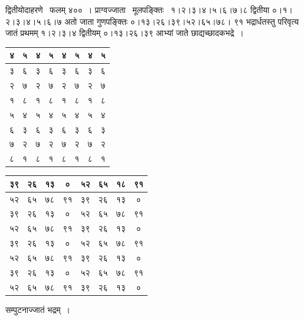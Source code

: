 \documentclass[11pt, openany]{book}
\begin{document}
द्वितीयोदाहरणे ~फलम् \;४००~। \;प्राग्वज्जाता ~मूलपङ्क्तिः ~१।२।३।४।५।६।७।८ द्वितीया ०।१।२।३।४।५।६।७ अतो जाता गुणपङ्क्तिः ०।१३।२६।३९।५२।६५।७८। ९१ भद्रार्धतस्तु परिवृत्य जातं प्रथमम् १।२।३।४ द्वितीयम् ०।१३।२६।३९ आभ्यां जाते छाद्यच्छादकभद्रे~।

\begin{table}[h]
	\centering
	\setlength{\extrarowheight}{2pt} \setlength{\tabcolsep}{3pt}
	\begin{tabular}{|c|c|c|c|c|c|c|c|}
		\hline
		४& ५ & ४ & ५ & ४ & ५ & ४ & ५\\
		\hline
		३ & ६ & ३ & ६ & ३ & ६ & ३ & ६ \\
		\hline
		२& ७ & २ & ७ & २ & ७ & २& ७ \\
		\hline
		१ & ८ & १ & ८ & १ & ८ & १ &८ \\
		\hline
		५ & ४ & ५ & ४ & ५ & ४ &५ & ४\\
		\hline
		६ & ३ & ६ & ३ & ६ & ३ & ६ & ३\\
		\hline
		७ & २ & ७ & २ & ७ & २ & ७ & २\\
		\hline
		८ & १ & ८ & १ & ८ & १ & ८ & १\\
		\hline
	\end{tabular}\qquad
	\begin{tabular}{|c|c|c|c|c|c|c|c|}
		\hline
		३९ & २६ & १३ & ० & ५२ & ६५ & १८ & ९१\\
		\hline
		५२& ६५ & ७८ & ९१ & ३९ & २६ & १३ & ० \\
		\hline
		३९& २६ & १३ & ० & ५२ & ६५ & ७८ & ९१\\ 
		\hline
		५२ & ६५ & ७८ & ९१ &३९ & २६ & १३ & ० \\
		\hline
		३९ & २६ & १३ & ० & ५२& ६५ & ७८ & ९१\\
		\hline
		५२ & ६५ & ७८ & ९१ & ३९ & २६ & १३ & ० \\
		\hline
		३९ & २६ & १३ & ० & ५२ & ६५ & ७८ & ९१\\
		\hline
		५२ & ६५ & ७८ & ९१ & ३९ & २६ & १३ & ०\\
		\hline
	\end{tabular}
\end{table}%

\newpage

\begin{center}
सम्पुटनाज्जातं भद्रम्~।	
\end{center}
\vspace{-4mm}
\end{document}
